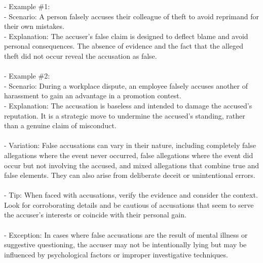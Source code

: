 \documentclass[a4paper,12pt,single,pdftex]{scrartcl}
\begin{document}
    
      - Example \#1:
    \\

    
        - Scenario: A person falsely accuses their colleague of theft to avoid reprimand for their own mistakes.
    \\

    
        - Explanation: The accuser's false claim is designed to deflect blame and avoid personal consequences. The absence of evidence and the fact that the alleged theft did not occur reveal the accusation as false.
    \\

    
      
    \\

    
      - Example \#2:
    \\

    
        - Scenario: During a workplace dispute, an employee falsely accuses another of harassment to gain an advantage in a promotion contest.
    \\

    
        - Explanation: The accusation is baseless and intended to damage the accused's reputation. It is a strategic move to undermine the accused's standing, rather than a genuine claim of misconduct.
    \\

    
      
    \\

    
      - Variation: False accusations can vary in their nature, including completely false allegations where the event never occurred, false allegations where the event did occur but not involving the accused, and mixed allegations that combine true and false elements. They can also arise from deliberate deceit or unintentional errors.
    \\

    
      
    \\

    
      - Tip: When faced with accusations, verify the evidence and consider the context. Look for corroborating details and be cautious of accusations that seem to serve the accuser's interests or coincide with their personal gain.
    \\

    
      
    \\

    
      - Exception: In cases where false accusations are the result of mental illness or suggestive questioning, the accuser may not be intentionally lying but may be influenced by psychological factors or improper investigative techniques.
    \\
\end{document}
